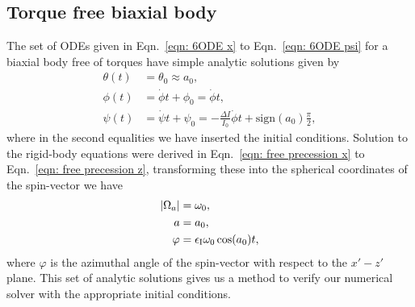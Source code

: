 \documentclass[../full_thesis/full_thesis.tex]{subfiles}
\begin{document}
\subsection{Torque free biaxial body}
\label{sec: biaxial body with no torque}

The set of ODEs given in Eqn.~\eqref{eqn: 6ODE x} to Eqn.~\eqref{eqn: 6ODE psi}
for a biaxial body free of torques have simple analytic solutions
\citep{Landau1969} given by
\begin{align}
    \theta(t) & = \theta_{0} \approx a_{0}, \label{eqn: theta TF}\\
    \phi(t) & = \dot{\phi}t + \phi_{0} = \dot{\phi} t, \label{eqN; phi TF}\\
    \psi(t) & = \dot{\psi}t + \psi_{0}=
 -\frac{\Delta I}{I_0}\dot{\phi} t + \textrm{sign}(a_0)\frac{\pi}{2},
\label{eqn: psi TF}
\end{align}
where in the second equalities we have inserted the initial conditions.
Solution to the rigid-body equations were derived in Eqn.~\eqref{eqn: free
precession x} to Eqn.~\eqref{eqn: free precession z}, transforming these into
the spherical coordinates of the spin-vector we have
\begin{align}
|\Omega_a| & = \omega_0, \label{eqn: omega TF}\\
a & = a_0, \label{eqn: a TF} \\
\varphi & = \epsilon_{\mathrm{I}}\omega_0 \cos(a_0) t,
\label{eqn: varphi TF}
\end{align}
where $\varphi$ is the azimuthal angle of the spin-vector with respect to the
$x'-z'$ plane.  This set of analytic solutions gives us a method to verify our
numerical solver with the appropriate initial conditions.
\end{document}
